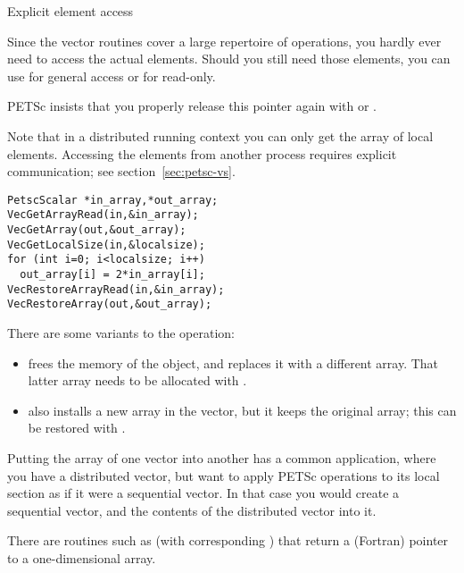  {Explicit element access}

Since the vector routines cover a large repertoire of operations, you
hardly ever need to access the actual elements. Should you still need
those elements, you can use  for general
access or  for read-only.

PETSc insists that you properly release this pointer again with
 or
.

Note that in a distributed running context you can only get the array
of local elements. Accessing the elements from another process
requires explicit communication; see section~\ref{sec:petsc-vs}.

\begin{lstlisting}
PetscScalar *in_array,*out_array;
VecGetArrayRead(in,&in_array);
VecGetArray(out,&out_array);
VecGetLocalSize(in,&localsize);
for (int i=0; i<localsize; i++)
  out_array[i] = 2*in_array[i];
VecRestoreArrayRead(in,&in_array);
VecRestoreArray(out,&out_array);
\end{lstlisting}

There are some variants to the  operation:
\begin{itemize}
\item {} frees the memory of the
   object, and replaces it with a different array. That
  latter array needs to be allocated with
  .
\item {} also installs a new array in the
  vector, but it keeps the original array; this can be restored with
  .
\end{itemize}

Putting the array of one vector into another has a common application,
where you have a distributed vector, but want to apply PETSc operations
to its local section as if it were a sequential vector. In that case
you would create a sequential vector, and
 the contents of the distributed vector
into it.

\begin{fortrannote}
  There are routines such as 
  (with corresponding )
  that
  return a (Fortran) pointer to a one-dimensional array.
\end{fortrannote}

